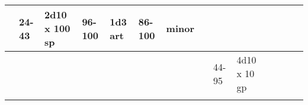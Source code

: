 \begin{longtable}{llllllllllllll}
{\begin{minipage}[t]{1.150in}
\end{minipage}} & \multicolumn{1}{|p{0.393in}|}{\begin{minipage}[t]{0.393in}\raggedright
24-43\end{minipage}} & \multicolumn{1}{p{0.469in}|}{\begin{minipage}[t]{0.469in}\raggedright
2d10 x 100 sp\end{minipage}} & \multicolumn{1}{p{0.923in}|}{\begin{minipage}[t]{0.923in}\raggedright
96-100\end{minipage}} & \multicolumn{1}{p{0.469in}|}{\begin{minipage}[t]{0.469in}\raggedright
1d3 art\end{minipage}} & \multicolumn{1}{p{0.626in}|}{\begin{minipage}[t]{0.626in}\raggedright
86-100\end{minipage}} & \multicolumn{1}{p{0.469in}|}{\begin{minipage}[t]{0.469in}\centering
1 minor\end{minipage}}\\
\hline
\multicolumn{8}{p{1.150in}|}{\begin{minipage}[t]{1.150in}\centering
\end{minipage}} & \multicolumn{1}{|p{0.393in}|}{\begin{minipage}[t]{0.393in}\raggedright
44-95\end{minipage}} & \multicolumn{1}{p{0.469in}|}{\begin{minipage}[t]{0.469in}\raggedright
4d10 x 10 gp\end{minipage}} & \multicolumn{1}{p{0.923in}|}{\begin{minipage}[t]{0.923in}\raggedright
\end{minipage}} & \multicolumn{1}{p{0.469in}|}{\begin{minipage}[t]{0.469in}\raggedright
\end{minipage}} & \multicolumn{1}{p{0.626in}|}{\begin{minipage}[t]{0.626in}\raggedright
\end{minipage}} & \multicolumn{1}{p{0.469in}|}{\begin{minipage}[t]{0.469in}\centering
\end{minipage}}\\
\hline
\multicolumn{8}{p{1.150in}|}{\begin{minipage}[t]{1.150in}\centering
\end{minipage}} & \multicolumn{1}{|p{0.393in}|}{\begin{minipage}[t]{0.393in}\raggedright

\end{minipage}}
\end{longtable}
